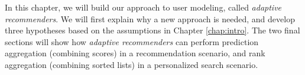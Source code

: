\label{chap:methods}

In this chapter, we will build our approach to user modeling,
called \emph{adaptive recommenders}.
We will first explain why a new approach is needed,
and develop three hypotheses based on the 
assumptions in Chapter \ref{chap:intro}.
The two final sections will show how \emph{adaptive recommenders}
can perform prediction aggregation (combining scores) in a recommendation scenario,
and rank aggregation (combining sorted lists) in a personalized search scenario.








%
